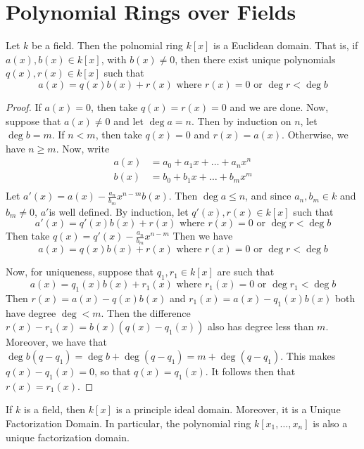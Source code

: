 \section{Polynomial Rings over Fields}
\label{section_7.4}

\begin{theorem}\label{theorem_7.4.1}
  Let $k$ be a field. Then the polnomial ring $k[x]$ is a Euclidean domain.
  That is, if $a(x),b(x) \in k[x]$, with $b(x) \neq 0$, then there exist
  unique polynomials $q(x), r(x) \in k[x]$ such that
  \begin{equation*}
    a(x)=q(x)b(x)+r(x) \text{ where } r(x)=0 \text{ or } \deg{r}<\deg{b}
  \end{equation*}
\end{theorem}
\begin{proof}
  If $a(x)=0$, then take $q(x)=r(x)=0$ and we are done. Now, suppose that
  $a(x) \neq 0$ and let $\deg{a}=n$. Then by induction on $n$, let
  $\deg{b}=m$. If $n<m$, then take  $q(x)=0$ and $r(x)=a(x)$. Otherwise, we
  have $n \geq m$. Now, write
  \begin{align*}
    a(x)    &=  a_0+a_1x+\dots+a_nx^n   \\
    b(x)    &=  b_0+b_1x+\dots+b_mx^m   \\
  \end{align*}
  Let $a'(x)=a(x)-\frac{a_n}{b_m}x^{n-m}b(x)$. Then $\deg{a} \leq n$, and
  since $a_n,b_m \in k$ and  $b_m \neq 0$,  $a'$is well defined. By induction,
  let  $q'(x),r(x) \in k[x]$ such that
  \begin{equation*}
    a'(x)=q'(x)b(x)+r(x) \text{ where } r(x)=0 \text{ or } \deg{r}<\deg{b}
  \end{equation*}
  Then take $q(x)=q'(x)-\frac{a_n}{b_m}x^{n-m}$ Then we have
  \begin{equation*}
    a(x)=q(x)b(x)+r(x) \text{ where } r(x)=0 \text{ or } \deg{r}<\deg{b}
  \end{equation*}

  Now, for uniqueness, suppose that $q_1,r_1 \in k[x]$ are such that
  \begin{equation*}
    a(x)=q_1(x)b(x)+r_1(x) \text{ where } r_1(x)=0 \text{ or } \deg{r_1}<\deg{b}
  \end{equation*}
  Then $r(x)=a(x)-q(x)b(x)$ and $r_1(x)=a(x)-q_1(x)b(x)$ both have degree
  $\deg<m$. Then the difference  $r(x)-r_1(x)=b(x)(q(x)-q_1(x))$ also has
  degree less than $m$. Moreover, we have that
  $\deg{b(q-q_1)}=\deg{b}+\deg{(q-q_1)}=m+\deg{(q-q_1)}$. This makes
  $q(x)-q_1(x)=0$, so that $q(x)=q_1(x)$. It follows then that $r(x)=r_1(x)$.
\end{proof}
\begin{corollary}
  If $k$ is a field, then $k[x]$ is a principle ideal domain. Moreover, it is
  a Unique Factorization Domain. In particular, the polynomial ring
  $k[x_1, \dots, x_n]$ is also a unique factorization domain.
\end{corollary}

